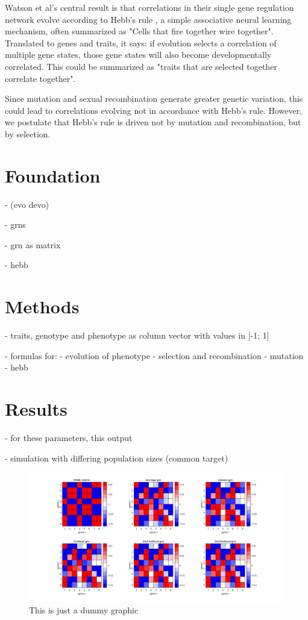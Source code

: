 \documentclass{article}
\begin{document}
Watson et al's central result is that correlations in their single gene regulation network evolve according to Hebb’s rule \cite{hebb}, a simple associative neural learning mechanism, often summarized as "Cells that fire together wire together". \cite{Lowel209} Translated to genes and traits, it says: if evolution selects a correlation of multiple gene states, those gene states will also become developmentally correlated. This could be summarized as "traits that are selected together correlate together". \cite{watson2014}


Since mutation and sexual recombination generate greater genetic variation, this could lead to correlations evolving not in accordance with Hebb's rule. However, we postulate that Hebb’s rule is driven not by mutation and recombination, but by selection.

\section{Foundation}



- (evo devo)

- grns

- grn as matrix

- hebb


\section{Methods}

- traits, genotype and phenotype as column vector with values in [-1; 1]

- formulas for:
	- evolution of phenotype
	- selection and recombination
	- mutation
	- hebb



\section{Results}

- for these parameters, this output

- simulation with differing population sizes (common target)

\begin{figure}[H]
	\includegraphics[width=\linewidth]{./img/dummy.jpg}
	\caption{This is just a dummy graphic}
	\label{fig:dummy}
\end{figure}
\end{document}
